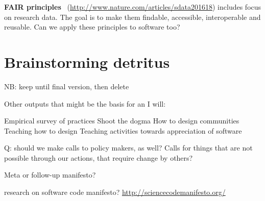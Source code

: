 \documentclass[a4paper,UKenglish]{dagman}
\newcommand{\manifesto}[1]{{\bf #1}\xspace}
\begin{document}
\begin{appendix}
\manifesto{FAIR principles}~\cite{wilkinson_fair_2016}
(\url{http://www.nature.com/articles/sdata201618})
includes focus on research data. The goal is to make them findable, accessible, interoperable and reusable. Can we apply these principles to software too?


\section*{Brainstorming detritus}

NB: keep until final version, then delete

Other outputs that might be the basis for an I will:

Empirical survey of practices
Shoot the dogma
How to design communities
Teaching how to design
Teaching activities towards appreciation of software

Q: should we make calls to policy makers, as well? Calls for things that are not possible through our actions, that require change by others? 

Meta or follow-up manifesto?

research on software code manifesto?
\url{http://sciencecodemanifesto.org/}


\end{appendix}
\end{document}
